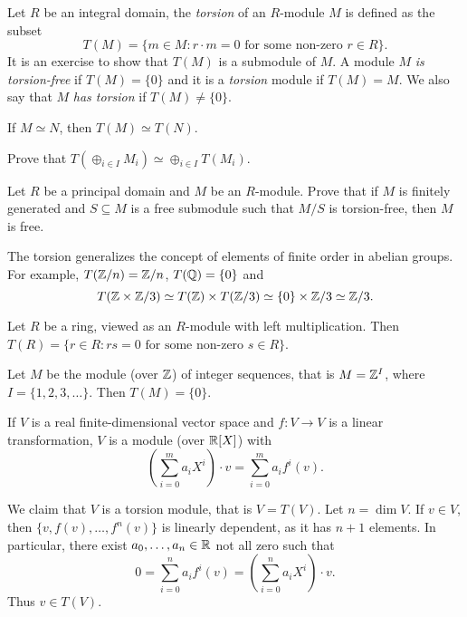 Let $R$ be an integral domain, the \emph{torsion} of an $R$-module $M$ 
is defined as the subset 
\[
T(M)=\{m\in M:r\cdot m=0\text{ for some non-zero $r\in R$}\}.
\]
It is an exercise to show that $T(M)$ is a submodule of $M$. 
A module $M$ 
\emph{is torsion-free} if $T(M)=\{0\}$ and it is 
a \emph{torsion} module if $T(M)=M$.  We also say that $M$ \emph{has torsion}
if $T(M)\ne\{0\}$. 

\begin{exercise}
If $M\simeq N$, then $T(M)\simeq T(N)$.
\end{exercise}

\begin{exercise}
Prove that $T(\oplus_{i\in I}M_i)\simeq \oplus_{i\in I}T(M_i)$.
\end{exercise}

\begin{exercise}
\label{xca:free}
    Let $R$ be a principal domain and $M$ be an $R$-module. Prove that
    if $M$ is finitely generated and $S\subseteq M$ is a free submodule such that
    $M/S$ is torsion-free, then $M$ is free.
\end{exercise}

The torsion generalizes the concept of elements of finite order in abelian groups. For example, 
 $T(\mathbb{Z}/n)=\mathbb{Z}/n$, $T(\mathbb{Q})=\{0\}$ and
 \[
 T(\mathbb{Z}\times\mathbb{Z}/3)\simeq T(\mathbb{Z})\times T(\mathbb{Z}/3)\simeq \{0\}\times\mathbb{Z}/3\simeq\mathbb{Z}/3.
 \]

\begin{example}
    Let $R$ be a ring, viewed as an $R$-module with left multiplication. 
    Then $T(R)=\{r\in R:rs=0\text{ for some non-zero $s\in R$}\}$.
\end{example}

\begin{example}
    Let $M$ be the module (over $\mathbb{Z}$) of
    integer sequences, that is $M=\mathbb{Z}^I$, where 
    $I=\{1,2,3,\dots\}$. Then $T(M)=\{0\}$. 
\end{example}

\begin{example}
If $V$ is a real finite-dimensional vector space and $f\colon V\to V$ 
is a linear transformation, $V$ is a module (over $\mathbb{R}[X]$) 
with 
\[
\left(\sum_{i=0}^m a_iX^i\right)\cdot v=\sum_{i=0}^m a_if^i(v).
\]

We claim that 
$V$ is a torsion module, that is $V=T(V)$. Let $n=\dim V$. If $v\in V$, 
then $\{v,f(v),\dots,f^n(v)\}$ is linearly dependent, as it has 
$n+1$ elements. In particular, there exist $a_0,\dots,a_n\in\mathbb{R}$ not all zero such that
\[
0=\sum_{i=0}^n a_if^i(v)=\left(\sum_{i=0}^n a_iX^i\right)\cdot v.
\]
Thus $v\in T(V)$. 
\end{example}

